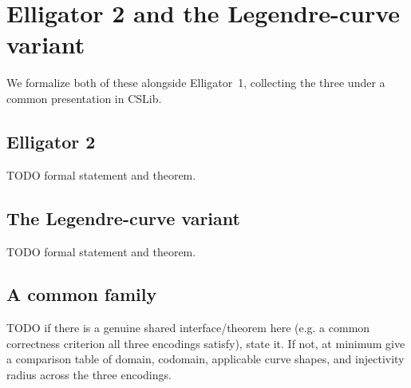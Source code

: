 \section{Elligator 2 and the Legendre-curve variant}
\label{sec:elligator2-legendre}

We formalize both of these alongside Elligator~1, collecting the
three under a common presentation in CSLib.

\subsection{Elligator 2}
\label{subsec:elligator2}

TODO formal statement and theorem.

\subsection{The Legendre-curve variant}
\label{subsec:legendre-variant}

TODO formal statement and theorem.

\subsection{A common family}
\label{subsec:common-family}

TODO if there is a genuine shared interface/theorem here
(e.g. a common correctness criterion all three encodings satisfy),
state it. If not, at minimum give a comparison table of domain,
codomain, applicable curve shapes, and injectivity radius across
the three encodings.

